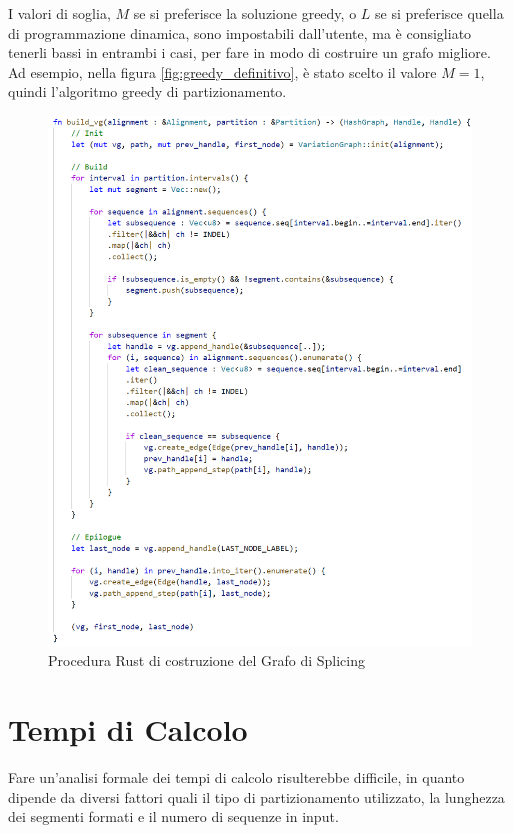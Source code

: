 I valori di soglia, $M$ se si preferisce la soluzione greedy, o $L$ se si preferisce quella di programmazione dinamica, sono impostabili dall'utente, ma è consigliato tenerli bassi in entrambi i casi, per fare in modo di costruire un grafo migliore. Ad esempio, nella figura \ref{fig:greedy_definitivo}, è stato scelto il valore $M=1$, quindi l'algoritmo greedy di partizionamento.

\begin{figure}
    \centering
    \includegraphics[scale=0.7]{images/build_vg.PNG}
    \caption{Procedura Rust di costruzione del Grafo di Splicing}
    \label{fig:build_vg}
\end{figure}

\newpage

\section{Tempi di Calcolo}
Fare un'analisi formale dei tempi di calcolo risulterebbe difficile, in quanto dipende da diversi fattori quali il tipo di partizionamento utilizzato, la lunghezza dei segmenti formati e il numero di sequenze in input.  


